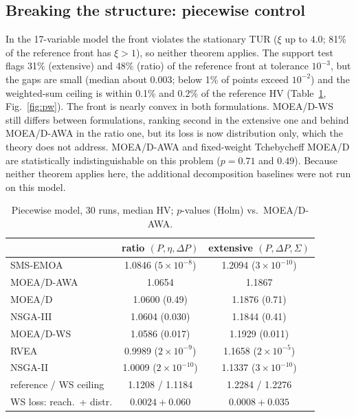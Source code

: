 \documentclass[journal]{IEEEtran}
\theoremstyle{remark}
\begin{document}
\subsection{Breaking the structure: piecewise control}

In the 17-variable model the front violates the stationary TUR ($\xi$ up to $4.0$; 81\% of the
reference front has $\xi > 1$), so neither theorem applies. The support test flags 31\%
(extensive) and 48\% (ratio) of the reference front at tolerance $10^{-3}$, but the gaps are small
(median about $0.003$; below 1\% of points exceed $10^{-2}$) and the weighted-sum ceiling is within
0.1\% and 0.2\% of the reference HV (Table~\ref{tab:pw}, Fig.~\ref{fig:pw}). The front is nearly
convex in both formulations. MOEA/D-WS still differs between formulations, ranking second in the
extensive one and behind MOEA/D-AWA in the ratio one, but its loss is now distribution only, which
the theory does not address. MOEA/D-AWA and fixed-weight Tchebycheff MOEA/D are statistically
indistinguishable on this problem ($p = 0.71$ and $0.49$). Because neither theorem applies here, the
additional decomposition baselines were not run on this model.

\begin{table}[t]
\caption{Piecewise model, 30 runs, median HV; $p$-values (Holm) vs.\ MOEA/D-AWA.}
\label{tab:pw}
\centering
\footnotesize
\begin{tabular}{lcc}
\toprule
 & ratio $(P,\eta,\Delta P)$ & extensive $(P,\Delta P,\Sigma)$\\
\midrule
SMS-EMOA & 1.0846 ($5\times10^{-8}$) & 1.2094 ($3\times10^{-10}$)\\
MOEA/D-AWA & 1.0654 & 1.1867\\
MOEA/D & 1.0600 (0.49) & 1.1876 (0.71)\\
NSGA-III & 1.0604 (0.030) & 1.1844 (0.41)\\
MOEA/D-WS & 1.0586 (0.017) & 1.1929 (0.011)\\
RVEA & 0.9989 ($2\times10^{-9}$) & 1.1658 ($2\times10^{-5}$)\\
NSGA-II & 1.0009 ($2\times10^{-10}$) & 1.1337 ($3\times10^{-10}$)\\
\midrule
reference / WS ceiling & 1.1208 / 1.1184 & 1.2284 / 1.2276\\
WS loss: reach.\ + distr. & $0.0024 + 0.060$ & $0.0008 + 0.035$\\
\bottomrule
\end{tabular}
\end{table}
\end{document}
